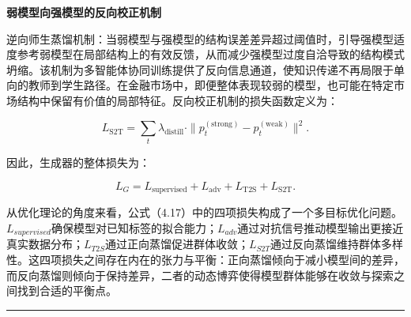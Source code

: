 \noindent\textbf{弱模型向强模型的反向校正机制}\par

逆向师生蒸馏机制：当弱模型与强模型的结构误差差异超过阈值时，引导强模型适度参考弱模型在局部结构上的有效反馈，从而减少强模型过度自洽导致的结构模式坍缩。该机制为多智能体协同训练提供了反向信息通道，使知识传递不再局限于单向的教师到学生路径。在金融市场中，即便整体表现较弱的模型，也可能在特定市场结构中保留有价值的局部特征。反向校正机制的损失函数定义为：

\begin{equation}
L_{\text{S2T}}
=
\sum_{t}
\lambda_{\text{distill}}
\cdot
\|p^{(\text{strong})}_t - p^{(\text{weak})}_t\|^2.
\end{equation}

因此，生成器的整体损失为：

\begin{equation}
L_G
=
L_{\text{supervised}}
+
L_{\text{adv}}
+
L_{\text{T2S}}
+
L_{\text{S2T}}.
\end{equation}

从优化理论的角度来看，公式（4.17）中的四项损失构成了一个多目标优化问题。$L_{supervised}$确保模型对已知标签的拟合能力；$L_{adv}$通过对抗信号推动模型输出更接近真实数据分布；$L_{T2S}$通过正向蒸馏促进群体收敛；$L_{S2T}$通过反向蒸馏维持群体多样性。这四项损失之间存在内在的张力与平衡：正向蒸馏倾向于减小模型间的差异，而反向蒸馏则倾向于保持差异，二者的动态博弈使得模型群体能够在收敛与探索之间找到合适的平衡点。

\noindent\rule{\textwidth}{0.4pt}

